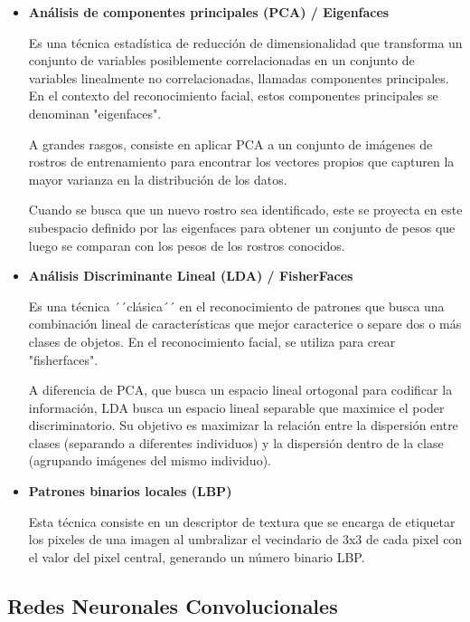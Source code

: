 \begin{itemize}
	
	\item \textbf{Análisis de componentes principales (PCA) / Eigenfaces}
	 
	 Es una técnica estadística de reducción de dimensionalidad que transforma un conjunto de variables posiblemente correlacionadas en un conjunto de variables linealmente no correlacionadas, llamadas componentes principales. En el contexto del reconocimiento facial, estos componentes principales se denominan "eigenfaces".
	 
	 A grandes rasgos, consiste en aplicar PCA a un conjunto de imágenes de rostros de entrenamiento para encontrar los vectores propios que capturen la mayor varianza en la distribución de los datos.
	 
	 Cuando se busca que un nuevo rostro sea identificado, este se proyecta en este subespacio definido por las eigenfaces para obtener un conjunto de pesos que luego se comparan con los pesos de los rostros conocidos.
	 
	 \item \textbf{Análisis Discriminante Lineal (LDA) / FisherFaces}
	 
	  Es una técnica ´´clásica´´ en el reconocimiento de patrones que busca una combinación lineal de características que mejor caracterice o separe dos o más clases de objetos. En el reconocimiento facial, se utiliza para crear "fisherfaces".
	  
	  A diferencia de PCA, que busca un espacio lineal ortogonal para codificar la información, LDA busca un espacio lineal separable que maximice el poder discriminatorio. Su objetivo es maximizar la relación entre la dispersión entre clases (separando a diferentes individuos) y la dispersión dentro de la clase (agrupando imágenes del mismo individuo).
	  
	  \item \textbf{Patrones binarios locales (LBP)}
	  
	  Esta técnica consiste en un descriptor de textura que se encarga de etiquetar los pixeles de una imagen al umbralizar el vecindario de 3x3 de cada pixel con el valor del pixel central, generando un número binario LBP.
	
\end{itemize}


\subsection{Redes Neuronales Convolucionales}

